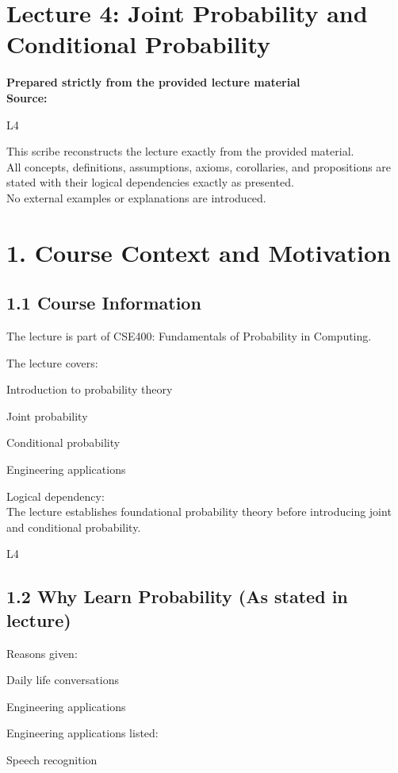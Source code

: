 \documentclass[12pt]{article}
\begin{document}
\section*{Lecture 4: Joint Probability and Conditional Probability}

\textbf{Prepared strictly from the provided lecture material} \\
\textbf{Source:} 

L4

This scribe reconstructs the lecture exactly from the provided material. \\
All concepts, definitions, assumptions, axioms, corollaries, and propositions are stated with their logical dependencies exactly as presented. \\
No external examples or explanations are introduced.

\section*{1. Course Context and Motivation}

\subsection*{1.1 Course Information}

The lecture is part of CSE400: Fundamentals of Probability in Computing.

The lecture covers:

Introduction to probability theory

Joint probability

Conditional probability

Engineering applications

Logical dependency: \\
The lecture establishes foundational probability theory before introducing joint and conditional probability. 

L4

\subsection*{1.2 Why Learn Probability (As stated in lecture)}

Reasons given:

Daily life conversations

Engineering applications

Engineering applications listed:

Speech recognition
\end{document}
